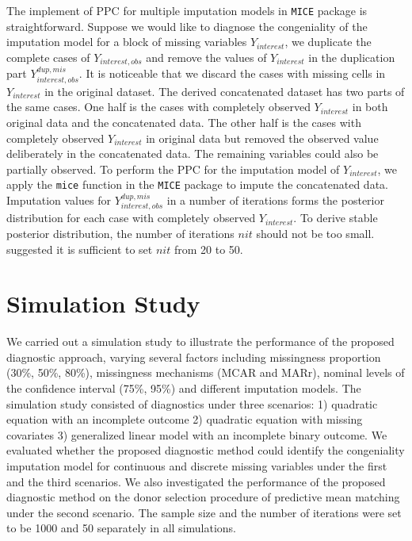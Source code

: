 	The implement of PPC for multiple imputation models in \texttt{MICE} package is straightforward. Suppose we would like to diagnose the congeniality of the imputation model for a block of missing variables $Y_{interest}$, we duplicate the complete cases of $Y_{interest, obs}$ and remove the values of $Y_{interest}$ in the duplication part $Y^{dup, mis}_{interest, obs}$. It is noticeable that we discard the cases with missing cells in $Y_{interest}$ in the original dataset. The derived concatenated dataset has two parts of the same cases. One half is the cases with completely observed $Y_{interest}$ in both original data and the concatenated data. The other half is the cases with completely observed $Y_{interest}$ in original data but removed the observed value deliberately in the concatenated data. The remaining variables could also be partially observed. To perform the PPC for the imputation model of $Y_{interest}$, we apply the \texttt{mice} function in the \texttt{MICE} package to impute the concatenated data. Imputation values for $Y^{dup, mis}_{interest, obs}$ in a number of iterations forms the posterior distribution for each case with completely observed $Y_{interest}$. To derive stable posterior distribution, the number of iterations $nit$ should not be too small. \citet{he2012diagnosing} suggested it is sufficient to set $nit$ from 20 to 50.    
	
	\section{Simulation Study}
	\label{sec:6.4}
	We carried out a simulation study to illustrate the performance of the proposed diagnostic approach, varying several factors including missingness proportion (30\%, 50\%, 80\%), missingness mechanisms (MCAR and MARr), nominal levels of the confidence interval (75\%, 95\%) and different imputation models. The simulation study consisted of diagnostics under three scenarios: 1) quadratic equation with an incomplete outcome 2) quadratic equation with missing covariates 3) generalized linear model with an incomplete binary outcome. We evaluated whether the proposed diagnostic method could identify the congeniality imputation model for continuous and discrete missing variables under the first and the third scenarios. We also investigated the performance of the proposed diagnostic method on the donor selection procedure of predictive mean matching under the second scenario. The sample size and the number of iterations were set to be 1000 and 50 separately in all simulations.  
	
